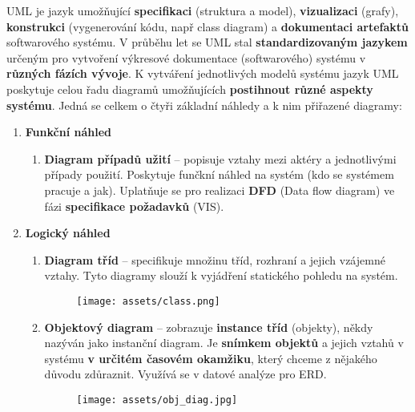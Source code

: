 UML je jazyk umožňující \textbf{specifikaci} (struktura a model), \textbf{vizualizaci} (grafy), \textbf{konstrukci} (vygenerování kódu, např class diagram) a \textbf{dokumentaci artefaktů} softwarového systému. V průběhu let se UML stal \textbf{standardizovaným jazykem }určeným pro vytvoření výkresové dokumentace (softwarového) systému v \textbf{různých fázích vývoje}. K vytváření jednotlivých modelů systému jazyk UML poskytuje celou řadu diagramů umožňujících \textbf{postihnout různé aspekty systému}. Jedná se celkem o čtyři základní náhledy a k nim přiřazené diagramy:

\begin{enumerate}
    \item \textbf{Funkční náhled}
          \begin{enumerate}
              \item \textbf{Diagram případů užití} -- popisuje vztahy mezi aktéry a jednotlivými případy použití. Poskytuje funčkní náhled na systém (kdo se systémem pracuje a jak). Uplatňuje se pro realizaci \textbf{DFD} (Data flow diagram) ve fázi \textbf{specifikace požadavků} (VIS).
          \end{enumerate}
    \item \textbf{Logický náhled}
          \begin{enumerate}
              \item \textbf{Diagram tříd} -- specifikuje množinu tříd, rozhraní a jejich vzájemné vztahy. Tyto diagramy slouží k vyjádření statického pohledu na systém.
                    \begin{figure}[H]
                        \centering
                        \texttt{[image: assets/class.png]}
                    \end{figure}
              \item \textbf{Objektový diagram} -- zobrazuje \textbf{instance tříd} (objekty), někdy nazýván jako instanční diagram.
                    Je \textbf{snímkem objektů} a jejich vztahů v systému \textbf{v určitém časovém okamžiku}, který chceme z nějakého důvodu zdůraznit. Využívá se v datové analýze pro ERD.
                    \begin{figure}[H]
                        \centering
                        \texttt{[image: assets/obj\_diag.jpg]}
                    \end{figure}
          \end{enumerate}


\end{enumerate}
